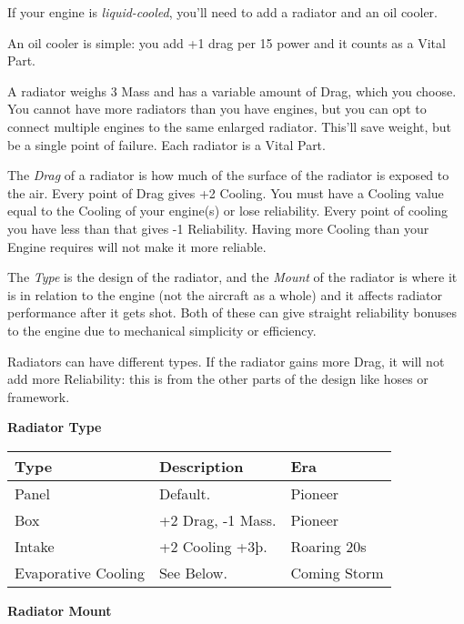 \documentclass{article}
\begin{document}
If your engine is \emph{liquid-cooled}, you'll need to add a radiator
and an oil cooler.

An oil cooler is simple: you add +1 drag per 15 power and it counts as a
Vital Part.

A radiator weighs 3 Mass and has a variable amount of Drag, which you
choose. You cannot have more radiators than you have engines, but you
can opt to connect multiple engines to the same enlarged radiator.
This'll save weight, but be a single point of failure. Each radiator is
a Vital Part.

The \emph{Drag }of a radiator is how much of the surface of the radiator
is exposed to the air. Every point of Drag gives +2 Cooling. You must
have a Cooling value equal to the Cooling of your engine(s) or lose
reliability. Every point of cooling you have less than that gives -1
Reliability. Having more Cooling than your Engine requires will not make
it more reliable.

The \emph{Type }is the design of the radiator, and the \emph{Mount} of
the radiator is where it is in relation to the engine (not the aircraft
as a whole) and it affects radiator performance after it gets shot. Both
of these can give straight reliability bonuses to the engine due to
mechanical simplicity or efficiency.

Radiators can have different types. If the radiator gains more Drag, it
will not add more Reliability: this is from the other parts of the
design like hoses or framework.

\textbf{Radiator Type}

\begin{tabular}{|l|l|l|}
    \hline
    Type                & Description       & Era          \\\hline
    Panel               & Default.          & Pioneer      \\\hline
    Box                 & +2 Drag, -1 Mass. & Pioneer      \\\hline
    Intake              & +2 Cooling +3þ.   & Roaring 20s  \\\hline
    Evaporative Cooling & See Below.        & Coming Storm \\\hline
\end{tabular}

\textbf{Radiator Mount}
\end{document}

